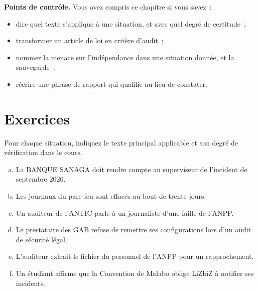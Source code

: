\begin{boxinfo}
\textbf{Points de contrôle.} Vous avez compris ce chapitre si vous savez~:
\begin{itemize}
    \item dire quel texte s'applique à une situation, et avec quel degré de
          certitude~;
    \item transformer un article de loi en critère d'audit~;
    \item nommer la menace sur l'indépendance dans une situation donnée, et
          la sauvegarde~;
    \item récrire une phrase de rapport qui qualifie au lieu de constater.
\end{itemize}
\end{boxinfo}

\section*{Exercices}

\begin{boxexo}[title={\ding{45}\quad Exercice~10.1. Quel texte~? \niveaubase}]
Pour chaque situation, indiquez le texte principal applicable et son degré
de vérification dans le cours.
\begin{enumerate}[(a)]
    \item La BANQUE SANAGA doit rendre compte au superviseur de l'incident
          de septembre 2026.
    \item Les journaux du pare-feu sont effacés au bout de trente jours.
    \item Un auditeur de l'ANTIC parle à un journaliste d'une faille de
          l'ANPP.
    \item Le prestataire des GAB refuse de remettre ses configurations lors
          d'un audit de sécurité légal.
    \item L'auditeur extrait le fichier du personnel de l'ANPP pour un
          rapprochement.
    \item Un étudiant affirme que la Convention de Malabo oblige LiZbiZ à
          notifier ses incidents.
\end{enumerate}
\end{boxexo}

